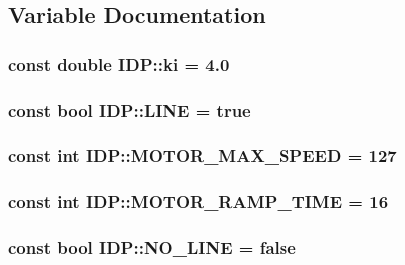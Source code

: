 \subsection{Variable Documentation}
\hypertarget{namespaceIDP_aa2b933f600179026dbca5d8bc63c3baf}{
\subsubsection[{ki}]{\setlength{\rightskip}{0pt plus 5cm}const double {\bf IDP::ki} = 4.0}}
\label{namespaceIDP_aa2b933f600179026dbca5d8bc63c3baf}
\hypertarget{namespaceIDP_a559427fa7c37f2edc0a43a4b793c4fdc}{
\subsubsection[{LINE}]{\setlength{\rightskip}{0pt plus 5cm}const bool {\bf IDP::LINE} = true}}
\label{namespaceIDP_a559427fa7c37f2edc0a43a4b793c4fdc}
\hypertarget{namespaceIDP_a4ead0b21ad2c507b542445695182d4cd}{
\subsubsection[{MOTOR\_\-MAX\_\-SPEED}]{\setlength{\rightskip}{0pt plus 5cm}const int {\bf IDP::MOTOR\_\-MAX\_\-SPEED} = 127}}
\label{namespaceIDP_a4ead0b21ad2c507b542445695182d4cd}
\hypertarget{namespaceIDP_ab3a00a6cc8a6dba271e38d337daf4703}{
\subsubsection[{MOTOR\_\-RAMP\_\-TIME}]{\setlength{\rightskip}{0pt plus 5cm}const int {\bf IDP::MOTOR\_\-RAMP\_\-TIME} = 16}}
\label{namespaceIDP_ab3a00a6cc8a6dba271e38d337daf4703}
\hypertarget{namespaceIDP_a5ea027b77276a637783f68955303b9b8}{
\subsubsection[{NO\_\-LINE}]{\setlength{\rightskip}{0pt plus 5cm}const bool {\bf IDP::NO\_\-LINE} = false}}
\label{namespaceIDP_a5ea027b77276a637783f68955303b9b8}
